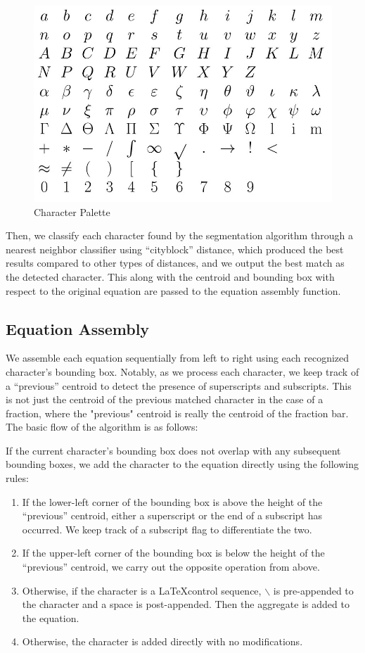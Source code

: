\documentclass[journal]{IEEEtran}
\begin{document}
\begin{figure}[!t]
    \centering
    \includegraphics[width=\columnwidth]{palette}
    \caption{Character Palette}
    \label{fig:palette}
\end{figure}

Then, we classify each character found by the segmentation algorithm through a nearest neighbor classifier using “cityblock” distance, which produced the best results compared to other types of distances, and we output the best match as the detected character. This along with the centroid and bounding box with respect to the original equation are passed to the equation assembly function.

\subsection{Equation Assembly}
We assemble each equation sequentially from left to right using each recognized character’s bounding box. Notably, as we process each character, we keep track of a “previous” centroid to detect the presence of superscripts and subscripts. This is not just the centroid of the previous matched character in the case of a fraction, where the "previous" centroid is really the centroid of the fraction bar. The basic flow of the algorithm is as follows:

If the current character’s bounding box does not overlap with any subsequent bounding boxes, we add the character to the equation directly using the following rules:
\begin{enumerate}
    \item If the lower-left corner of the bounding box is above the height of the “previous” centroid, either a superscript or the end of a subscript has occurred. We keep track of a subscript flag to differentiate the two.
    \item If the upper-left corner of the bounding box is below the height of the “previous” centroid, we carry out the opposite operation from above.
    \item Otherwise, if the character is a \LaTeX control sequence, $\backslash$ is pre-appended to the character and a space is post-appended. Then the aggregate is added to the equation.
    \item Otherwise, the character is added directly with no modifications.
    
\end{enumerate}
\end{document}
